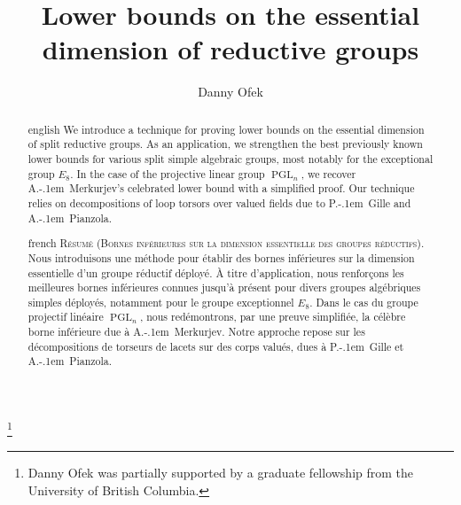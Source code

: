 \documentclass[12pt]{amsart}
\numberwithin{equation}{section}
\theoremstyle{definition}
\newcommand{\PGL}{\operatorname{PGL}}
\begin{document}
\author{Danny Ofek}   
\thanks{Danny Ofek was partially supported by a graduate fellowship from 
the University of British Columbia.} 




% 
%
%

\title{Lower bounds on the essential dimension of reductive groups}

\begin{abstract}
    \begin{otherlanguage*}{english}
    We introduce a technique for proving lower bounds on the essential dimension of split reductive groups. As an application, we strengthen the best previously known lower bounds for various split simple algebraic groups, most notably for the exceptional group $E_8$. In the case of the projective linear group $\PGL_n$, we recover A.\kern-.1em\ Merkurjev's celebrated lower bound with a simplified proof. Our technique relies on decompositions of loop torsors over valued fields due to P.\kern-.1em\ Gille and A.\kern-.1em\ Pianzola.
\end{otherlanguage*}

\bigskip
\begin{otherlanguage*}{french}
\noindent\textsc{Résumé (Bornes inférieures sur la dimension essentielle des groupes réductifs).}
Nous introduisons une méthode pour établir des bornes inférieures sur la dimension essentielle d’un groupe réductif déployé. À titre d’application, nous renforçons les meilleures bornes inférieures connues jusqu’à présent pour divers groupes algébriques simples déployés, notamment pour le groupe exceptionnel $E_8$.
Dans le cas du groupe projectif linéaire $\PGL_n$, nous redémontrons, par une preuve simplifiée, la célèbre borne inférieure due à A.\kern-.1em\ Merkurjev.
Notre approche repose sur les décompositions de torseurs de lacets sur des corps valués, dues à P.\kern-.1em\ Gille et A.\kern-.1em\ Pianzola.
\end{otherlanguage*}
\end{abstract} 
\end{document}
